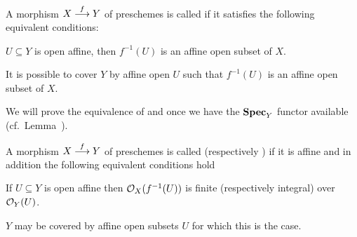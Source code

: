 \documentclass[a4paper,parskip=half,numbers=enddot, DIV=12]{scrreprt}
\begin{document}
\begin{defi} 
    A morphism $X\morphism[f] Y$ of preschemes is called  if it satisfies the following equivalent conditions:
    \begin{alphanumerate}
    \item 
        $U\subseteq Y$ is open affine, then $f^{-1}(U)$ is an affine open subset of $X$.
    \item 
        It is possible to cover $Y$ by affine open $U$ such that $f^{-1}(U)$ is an affine open subset of $X$.
    \end{alphanumerate}
\end{defi}
We will prove the equivalence of  and  once we have the $\operatorname{\mathbf{Spec}}_Y$ functor available (cf.\ Lemma~).
\begin{defi}
    A morphism $X\morphism[f] Y$ of preschemes is called  (respectively ) if it is affine and in addition the following equivalent conditions hold
    \begin{alphanumerate}
    \item 
        If $U\subseteq Y$ is open affine then $\mathcal{O}_X(f^{-1}(U))$ is finite (respectively integral) over $\mathcal{O}_Y(U)$.
    \item 
        $Y$ may be covered by affine open subsets $U$ for which this is the case. 
    \end{alphanumerate}
\end{defi}
\end{document}
